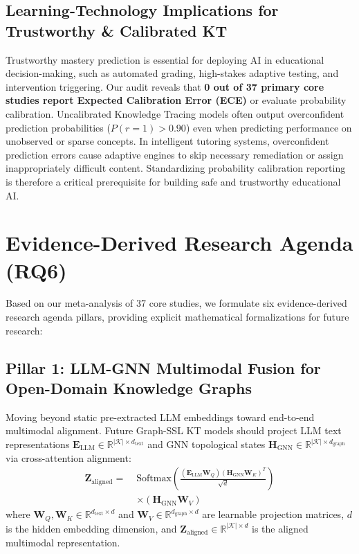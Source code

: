 \documentclass[10pt,journal,compsoc]{IEEEtran}
\begin{document}
\subsection{Learning-Technology Implications for Trustworthy \& Calibrated KT}
Trustworthy mastery prediction is essential for deploying AI in educational decision-making, such as automated grading, high-stakes adaptive testing, and intervention triggering. Our audit reveals that \textbf{0 out of 37 primary core studies report Expected Calibration Error (ECE)} or evaluate probability calibration. Uncalibrated Knowledge Tracing models often output overconfident prediction probabilities ($P(r=1) > 0.90$) even when predicting performance on unobserved or sparse concepts. In intelligent tutoring systems, overconfident prediction errors cause adaptive engines to skip necessary remediation or assign inappropriately difficult content. Standardizing probability calibration reporting is therefore a critical prerequisite for building safe and trustworthy educational AI.

\section{Evidence-Derived Research Agenda (RQ6)}
\label{sec:agenda}

Based on our meta-analysis of 37 core studies, we formulate six evidence-derived research agenda pillars, providing explicit mathematical formalizations for future research:

\subsection{Pillar 1: LLM-GNN Multimodal Fusion for Open-Domain Knowledge Graphs}
Moving beyond static pre-extracted LLM embeddings toward end-to-end multimodal alignment. Future Graph-SSL KT models should project LLM text representations $\mathbf{E}_{\text{LLM}} \in \mathbb{R}^{|\mathcal{K}| \times d_{\text{text}}}$ and GNN topological states $\mathbf{H}_{\text{GNN}} \in \mathbb{R}^{|\mathcal{K}| \times d_{\text{graph}}}$ via cross-attention alignment:
\begin{equation}
\begin{split}
\mathbf{Z}_{\text{aligned}} = \; & \text{Softmax}\left(\frac{(\mathbf{E}_{\text{LLM}}\mathbf{W}_Q)(\mathbf{H}_{\text{GNN}}\mathbf{W}_K)^T}{\sqrt{d}}\right) \\
& \times (\mathbf{H}_{\text{GNN}}\mathbf{W}_V)
\end{split}
\end{equation}
where $\mathbf{W}_Q, \mathbf{W}_K \in \mathbb{R}^{d_{\text{text}} \times d}$ and $\mathbf{W}_V \in \mathbb{R}^{d_{\text{graph}} \times d}$ are learnable projection matrices, $d$ is the hidden embedding dimension, and $\mathbf{Z}_{\text{aligned}} \in \mathbb{R}^{|\mathcal{K}| \times d}$ is the aligned multimodal representation.
\end{document}
